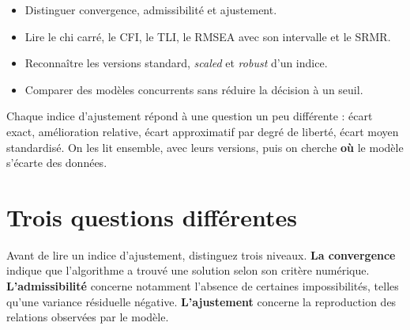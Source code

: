 \documentclass[
  french,
  11pt,
  a4paper,
  DIV=11,
  numbers=noendperiod]{scrreprt}
\providecommand{\tightlist}{%
  \setlength{\itemsep}{0pt}\setlength{\parskip}{0pt}}
\begin{document}
\begin{tcolorbox}[enhanced jigsaw, arc=.35mm, bottomrule=.15mm, bottomtitle=1mm, breakable, colback=white, colbacktitle=quarto-callout-note-color!10!white, colframe=quarto-callout-note-color-frame, coltitle=black, left=2mm, leftrule=.75mm, opacityback=0, opacitybacktitle=0.6, rightrule=.15mm, title={Objectifs du chapitre}, titlerule=0mm, toprule=.15mm, toptitle=1mm]

\begin{itemize}
\tightlist
\item
  Distinguer convergence, admissibilité et ajustement.
\item
  Lire le chi carré, le CFI, le TLI, le RMSEA avec son intervalle et le
  SRMR.
\item
  Reconnaître les versions standard, \emph{scaled} et \emph{robust} d'un
  indice.
\item
  Comparer des modèles concurrents sans réduire la décision à un seuil.
\end{itemize}

\end{tcolorbox}

\begin{tcolorbox}[enhanced jigsaw, arc=.35mm, bottomrule=.15mm, bottomtitle=1mm, breakable, colback=white, colbacktitle=quarto-callout-tip-color!10!white, colframe=quarto-callout-tip-color-frame, coltitle=black, left=2mm, leftrule=.75mm, opacityback=0, opacitybacktitle=0.6, rightrule=.15mm, title={Idée centrale}, titlerule=0mm, toprule=.15mm, toptitle=1mm]

Chaque indice d'ajustement répond à une question un peu différente :
écart exact, amélioration relative, écart approximatif par degré de
liberté, écart moyen standardisé. On les lit ensemble, avec leurs
versions, puis on cherche \textbf{où} le modèle s'écarte des données.

\end{tcolorbox}

\section{Trois questions
différentes}\label{trois-questions-diffuxe9rentes}

Avant de lire un indice d'ajustement, distinguez trois niveaux.
\textbf{La convergence} indique que l'algorithme a trouvé une solution
selon son critère numérique. \textbf{L'admissibilité} concerne notamment
l'absence de certaines impossibilités, telles qu'une variance résiduelle
négative. \textbf{L'ajustement} concerne la reproduction des relations
observées par le modèle.
\end{document}
